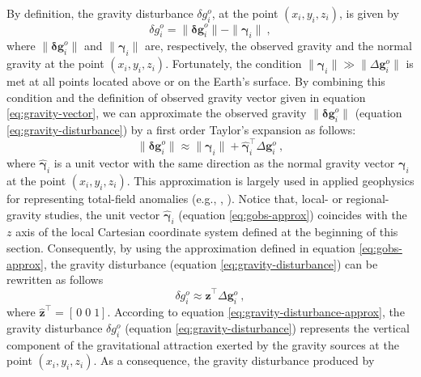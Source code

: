 \documentclass[paper,twocolumn,twoside]{geophysics}
\begin{document}
By definition, the gravity disturbance $\delta g^{o}_{i}$,
at the point $(x_{i}, y_{i}, z_{i})$, is given by
\begin{equation}
\delta g^{o}_{i} =  \| \mathbf{\delta g}^{o}_{i} \| - \| \boldsymbol{\gamma}_{i} \| \: ,
\label{eq:gravity-disturbance}
\end{equation}
where $\| \mathbf{\delta g}^{o}_{i} \|$ and $\| \boldsymbol{\gamma}_{i} \|$ are,
respectively, the observed gravity and the normal gravity at the
point $(x_{i}, y_{i}, z_{i})$.
Fortunately, the condition $\| \boldsymbol{\gamma}_{i} \| \gg \| \Delta \mathbf{g}^{o}_{i} \|$
is met at all points located above or on the Earth's surface.
By combining this condition and the definition of observed gravity vector
given in equation \ref{eq:gravity-vector}, we can approximate the observed gravity
$\| \mathbf{\delta g}^{o}_{i} \|$ (equation \ref{eq:gravity-disturbance})
by a first order Taylor's expansion as follows:
\begin{equation}
\| \mathbf{\delta g}^{o}_{i} \| \approx \| \boldsymbol{\gamma}_{i} \| + 
\hat{\boldsymbol{\gamma}}_{i}^{\top} \Delta \mathbf{g}^{o}_{i} \: ,
\label{eq:gobs-approx}
\end{equation}
where $\hat{\boldsymbol{\gamma}}_{i}$ is a unit vector with the same 
direction as the normal gravity vector $\boldsymbol{\gamma}_{i}$ at
the point $(x_{i}, y_{i}, z_{i})$.
This approximation is largely used in applied geophysics for representing
total-field anomalies (e.g., \citeauthor{blakely1996}, \citeyear{blakely1996}).
Notice that, local- or regional-gravity studies, the unit
vector $\hat{\boldsymbol{\gamma}}_{i}$ (equation \ref{eq:gobs-approx}) 
coincides with the $z$ axis
of the local Cartesian coordinate system defined
at the beginning of this section. Consequently,
by using the approximation defined in equation \ref{eq:gobs-approx}, 
the gravity disturbance (equation \ref{eq:gravity-disturbance}) can be 
rewritten as follows \begin{equation}
\delta g^{o}_{i} \approx \hat{\mathbf{z}}^{\top} \Delta \mathbf{g}^{o}_{i} \: ,
\label{eq:gravity-disturbance-approx}
\end{equation}
where $\hat{\mathbf{z}}^{\top} = \left[ \, 0 \; 0 \; 1 \right]$.
According to equation \ref{eq:gravity-disturbance-approx},
the gravity disturbance $\delta g^{o}_{i}$ (equation \ref{eq:gravity-disturbance})
represents the vertical component of the gravitational attraction exerted by
the gravity sources at the point $(x_{i}, y_{i}, z_{i})$.
As a consequence, the gravity disturbance produced by
\end{document}
